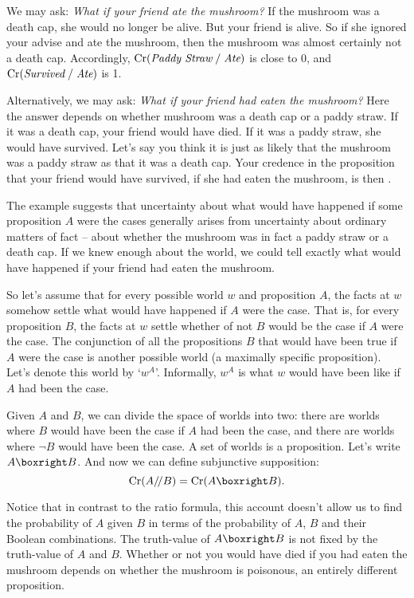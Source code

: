 {We may ask: \emph{What if your friend ate the mushroom?} If the mushroom was a
death cap, she would no longer be alive. But your friend is alive. So if she
ignored your advise and ate the mushroom, then the mushroom was almost certainly
not a death cap. Accordingly, $\text{Cr}(\emph{Paddy Straw}\;/\;\emph{Ate})$ is close
to 0, and $\text{Cr}(\emph{Survived}\;/\;\emph{Ate})$ is 1.

Alternatively, we may ask: \emph{What if your friend had eaten the mushroom?}
Here the answer depends on whether mushroom was a death cap or a paddy straw. If
it was a death cap, your friend would have died. If it was a paddy straw, she
would have survived. Let's say you think it is just as likely that the mushroom
was a paddy straw as that it was a death cap. Your credence in the proposition
that your friend would have survived, if she had eaten the mushroom, is then
.

The example suggests that uncertainty about what would have happened if some
proposition $A$ were the cases generally arises from uncertainty about ordinary
matters of fact -- about whether the mushroom was in fact a paddy straw or a
death cap. If we knew enough about the world, we could tell exactly what would
have happened if your friend had eaten the mushroom.

So let's assume that for every possible world $w$ and proposition $A$, the facts
at $w$ somehow settle what would have happened if $A$ were the case. That is,
for every proposition $B$, the facts at $w$ settle whether of not $B$ would be
the case if $A$ were the case. The conjunction of all the propositions $B$ that
would have been true if $A$ were the case is another possible world (a maximally
specific proposition). Let's denote this world by `$w^A$'. Informally, $w^A$ is
what $w$ would have been like if $A$ had been the case.

Given $A$ and $B$, we can divide the space of worlds into two: there are worlds
where $B$ would have been the case if $A$ had been the case, and there are
worlds where $\neg B$ would have been the case. A set of worlds is a
proposition. Let's write $A \boxright B$. And now we can define subjunctive
supposition:
\[
  \Cr(A/\!/B) = \Cr(A \boxright B).
\]

Notice that in contrast to the ratio formula, this account doesn't allow us to
find the probability of $A$ given $B$ in terms of the probability of $A$, $B$
and their Boolean combinations. The truth-value of $A \boxright B$ is not fixed
by the truth-value of $A$ and $B$. Whether or not you would have died if you had
eaten the mushroom depends on whether the mushroom is poisonous, an entirely
different proposition.

}
